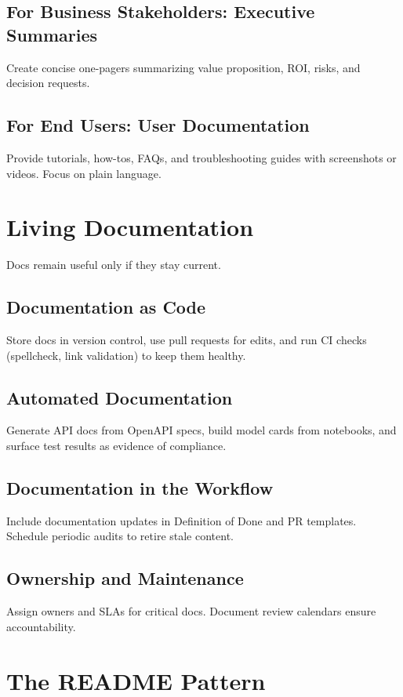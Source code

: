 \subsection{For Business Stakeholders: Executive Summaries}
Create concise one-pagers summarizing value proposition, ROI, risks, and decision requests.

\subsection{For End Users: User Documentation}
Provide tutorials, how-tos, FAQs, and troubleshooting guides with screenshots or videos. Focus on plain language.

\section{Living Documentation}
\label{sec:living-docs}

Docs remain useful only if they stay current.

\subsection{Documentation as Code}
Store docs in version control, use pull requests for edits, and run CI checks (spellcheck, link validation) to keep them healthy.

\subsection{Automated Documentation}
Generate API docs from OpenAPI specs, build model cards from notebooks, and surface test results as evidence of compliance.

\subsection{Documentation in the Workflow}
Include documentation updates in Definition of Done and PR templates. Schedule periodic audits to retire stale content.

\subsection{Ownership and Maintenance}
Assign owners and SLAs for critical docs. Document review calendars ensure accountability.

\section{The README Pattern}
\label{sec:readme-pattern}

